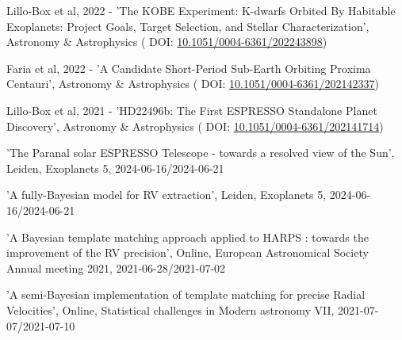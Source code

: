 \vspace*{0.3cm}

  {Lillo-Box} et al, 2022 - 'The {{KOBE}} Experiment: {{K-dwarfs Orbited By}} Habitable {{Exoplanets}}: {{Project}} Goals, Target Selection, and Stellar Characterization', Astronomy \& Astrophysics ( \textcolor{MarkerColour!80!black}{\scriptsize\faLink} DOI: \href{http://dx.doi.org/10.1051/0004-6361/202243898}{10.1051/0004-6361/202243898})

\vspace*{0.3cm}

  Faria et al, 2022 - 'A Candidate Short-Period Sub-{{Earth}} Orbiting {{Proxima Centauri}}', Astronomy \& Astrophysics ( \textcolor{MarkerColour!80!black}{\scriptsize\faLink} DOI: \href{http://dx.doi.org/10.1051/0004-6361/202142337}{10.1051/0004-6361/202142337})

\vspace*{0.3cm}

  {Lillo-Box} et al, 2021 - '{{HD22496b}}: The First {{ESPRESSO}} Standalone Planet Discovery', Astronomy \& Astrophysics ( \textcolor{MarkerColour!80!black}{\scriptsize\faLink} DOI: \href{http://dx.doi.org/10.1051/0004-6361/202141714}{10.1051/0004-6361/202141714})

\vspace*{0.3cm}

\vspace*{0.2cm}


\vspace*{0.2cm}

  'The Paranal solar ESPRESSO Telescope - towards a resolved view of the Sun', Leiden, Exoplanets 5, 2024-06-16/2024-06-21

\vspace*{0.3cm}

  'A fully-Bayesian model for RV extraction', Leiden, Exoplanets 5, 2024-06-16/2024-06-21

\vspace*{0.3cm}

  'A Bayesian template matching approach applied to HARPS : towards the improvement of the RV precision', Online, European Astronomical Society Annual meeting 2021, 2021-06-28/2021-07-02

\vspace*{0.3cm}

  'A semi-Bayesian implementation of template matching for precise Radial Velocities', Online, Statistical challenges in Modern astronomy VII, 2021-07-07/2021-07-10

